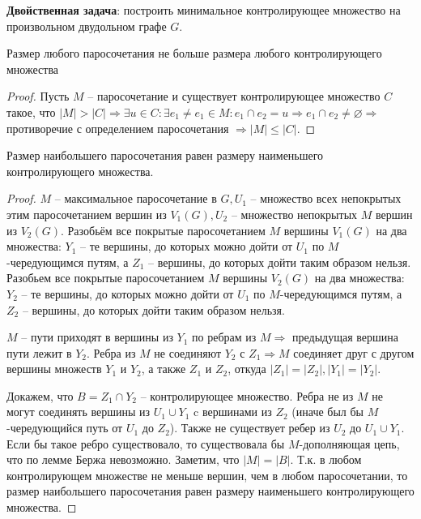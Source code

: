 	\textbf{Двойственная задача}: построить минимальное контролирующее множество на произвольном двудольном графе $G$.
	
	\begin{Lm}
		Размер любого паросочетания не больше размера любого контролирующего множества
	\end{Lm}

	\begin{proof}
		Пусть $M$ -- паросочетание и существует контролирующее множество $C$ такое, что $|M| > |C| \Rightarrow \exists u \in C: \exists e_1 \neq e_1\in M: e_1 \cap e_2 = u \Rightarrow e_1 \cap e_2 \neq \varnothing \Rightarrow$ противоречие с определением паросочетания $\Rightarrow |M| \leqslant |C|$.
	\end{proof}

	\begin{Thm}[Кёниг, 1931]
		Размер наибольшего паросочетания равен размеру наименьшего контролирующего множества.
	\end{Thm}

	\begin{proof}
		$M$ -- максимальное паросочетание в $G, U_1$ -- множество всех непокрытых этим паросочетанием вершин из $V_1(G), U_2 $ -- множество непокрытых $M$ вершин из $V_2(G)$.
		Разобьём все покрытые паросочетанием $M$ вершины $V_1(G)$ на два множества: $Y_1$ -- те вершины, до которых можно дойти от $U_1$ по $M$-чередующимся путям, а $Z_1$ -- вершины, до которых дойти таким образом нельзя.
		Разобьем все покрытые паросочетанием $M$ вершины $V_2(G)$ на два множества: $Y_2$ -- те вершины, до которых можно дойти от $U_1$ по $M$-чередующимся путям, а $Z_2$ -- вершины, до которых дойти таким образом нельзя.

		$M$ -- пути приходят в вершины из $Y_1$ по ребрам из $M \Rightarrow$ предыдущая вершина пути лежит в $Y_2$.
		Ребра из $M$ не соединяют $Y_2$ с $Z_1 \Rightarrow M$ соединяет друг с другом вершины множеств $Y_1$ и $Y_2$, а также $Z_1$ и $Z_2$, откуда $|Z_1| = |Z_2|, |Y_1| = |Y_2|$.
	
		Докажем, что $B = Z_1 \cap Y_2$ -- контролирующее множество. Ребра не из $M$ не могут соединять вершины из $U_1 \cup Y_1$ c вершинами из $Z_2$ (иначе был бы $M$-чередующийся путь от $U_1$ до $Z_2$).
		Также не существует ребер из $U_2$ до $U_1 \cup Y_1$. Если бы такое ребро существовало, то существовала бы $M$-дополняющая цепь, что по лемме Бержа невозможно. Заметим, что $|M| = |B|$. 
		Т.к. в любом контролирующем множестве не меньше вершин,  чем в любом паросочетании, то размер наибольшего паросочетания равен размеру наименьшего контролирующего множества.
	\end{proof}

